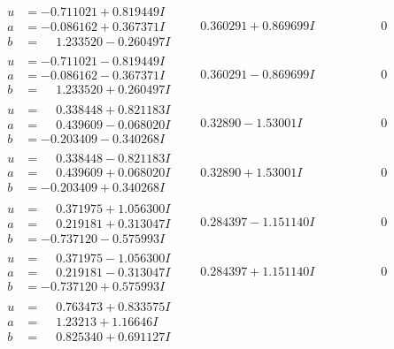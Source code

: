 \documentclass[1p]{elsarticle_modified}
\theoremstyle{definition}
\begin{document}
$$\begin{array}{c|c|c}
\begin{aligned}
u &= -0.711021 + 0.819449 I \\
a &= -0.086162 + 0.367371 I \\
b &= \phantom{-}1.233520 - 0.260497 I\end{aligned}
 & \phantom{-}0.360291 + 0.869699 I & \phantom{-0.000000 } 0 \\ \hline\begin{aligned}
u &= -0.711021 - 0.819449 I \\
a &= -0.086162 - 0.367371 I \\
b &= \phantom{-}1.233520 + 0.260497 I\end{aligned}
 & \phantom{-}0.360291 - 0.869699 I & \phantom{-0.000000 } 0 \\ \hline\begin{aligned}
u &= \phantom{-}0.338448 + 0.821183 I \\
a &= \phantom{-}0.439609 - 0.068020 I \\
b &= -0.203409 - 0.340268 I\end{aligned}
 & \phantom{-}0.32890 - 1.53001 I & \phantom{-0.000000 } 0 \\ \hline\begin{aligned}
u &= \phantom{-}0.338448 - 0.821183 I \\
a &= \phantom{-}0.439609 + 0.068020 I \\
b &= -0.203409 + 0.340268 I\end{aligned}
 & \phantom{-}0.32890 + 1.53001 I & \phantom{-0.000000 } 0 \\ \hline\begin{aligned}
u &= \phantom{-}0.371975 + 1.056300 I \\
a &= \phantom{-}0.219181 + 0.313047 I \\
b &= -0.737120 - 0.575993 I\end{aligned}
 & \phantom{-}0.284397 - 1.151140 I & \phantom{-0.000000 } 0 \\ \hline\begin{aligned}
u &= \phantom{-}0.371975 - 1.056300 I \\
a &= \phantom{-}0.219181 - 0.313047 I \\
b &= -0.737120 + 0.575993 I\end{aligned}
 & \phantom{-}0.284397 + 1.151140 I & \phantom{-0.000000 } 0 \\ \hline\begin{aligned}
u &= \phantom{-}0.763473 + 0.833575 I \\
a &= \phantom{-}1.23213 + 1.16646 I \\
b &= \phantom{-}0.825340 + 0.691127 I\end{aligned}

\end{array}$$
\end{document}
